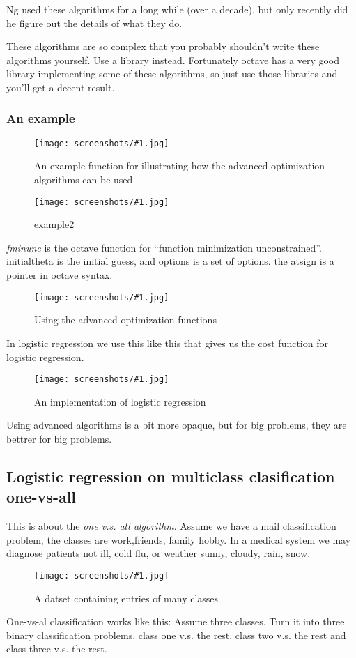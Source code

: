 \documentclass[a4, 12pt, english, USenglish]{scrreprt}
\newcommand{\screenshot}[2]{
\begin{figure}[htb]
\texttt{[image: screenshots/\#1.jpg]}
\label{#1}
\caption{#2}
\end{figure}}
\newcommand{\idx}[1]{{\em #1}\index{#1}}
\begin{document}
Ng used these algorithms for a long while (over a decade), but only
recently did he figure out the details of what they do.

These algorithms are so complex that you probably shouldn't write
these algorithms yourself.  Use a library instead.  Fortunately octave
has a very good library implementing some of these algorithms, so just
use those libraries and you'll get a decent result.

\subsubsection{An example}

\screenshot{exampleforadvancedoptimization}{An example function for
  illustrating how the advanced optimization algorithms can be used}

\screenshot{example2}{example2}

\idx{fminunc} is the octave function for ``function minimization
unconstrained''. initialtheta is the initial guess, and options is a
set of options.  the atsign is a pointer in octave syntax.

\screenshot{optimizingfuncparam}{Using the advanced optimization functions}

In logistic regression we use this like this that gives us the cost
function for logistic regression.

\screenshot{logisicregressionfunc}{An implementation of logistic regression}

Using advanced algorithms is a bit more opaque, but for big problems,
they are bettrer for big problems.

\subsection{Logistic regression on multiclass clasification
  one-vs-all}

This is about the \idx{one v.s. all algorithm}.  Assume we have a mail
classification problem, the classes are work,friends, family hobby.
In a medical system we may diagnose patients not ill, cold flu, or
weather sunny, cloudy, rain, snow.

\screenshot{multiclass-datasets}{A datset containing entries of many classes}

One-vs-al classification works like this:   Assume three classes.
Turn it into three binary classification problems. class one v.s. the
rest, class two v.s. the rest and class three v.s. the rest.
\end{document}
